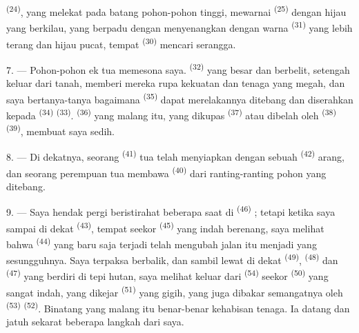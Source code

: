  \textsuperscript{(24)}, yang melekat pada batang
pohon-pohon tinggi, mewarnai  \textsuperscript{(25)}
dengan hijau yang berkilau, yang berpadu dengan menyenangkan dengan
warna  \textsuperscript{(31)} yang lebih terang dan hijau
pucat, tempat  \textsuperscript{(30)} mencari
serangga.

\VUsaut{3.0mm}
\VUsaut{3.0mm}

7. --- Pohon-pohon ek tua memesona saya. 
\textsuperscript{(32)} yang besar dan berbelit, setengah keluar dari
tanah, memberi mereka rupa kekuatan dan tenaga yang megah, dan saya
bertanya-tanya bagaimana  \textsuperscript{(35)}
dapat merelakannya ditebang dan diserahkan kepada 
\textsuperscript{(34)}  \textsuperscript{(33)}.
 \textsuperscript{(36)} yang malang itu, yang
dikupas  \textsuperscript{(37)} atau dibelah oleh
 \textsuperscript{(38)} 
\textsuperscript{(39)}, membuat saya sedih.

8. --- Di dekatnya, seorang 
\textsuperscript{(41)} tua telah menyiapkan dengan 
sebuah  \textsuperscript{(42)} arang, dan seorang
perempuan tua membawa  \textsuperscript{(40)}
 dari ranting-ranting pohon yang ditebang.

\VUsaut{3.0mm}
\VUsaut{3.0mm}

9. --- Saya hendak pergi beristirahat beberapa saat di  \textsuperscript{(46)} ; tetapi ketika saya sampai di
dekat  \textsuperscript{(43)}, tempat seekor
 \textsuperscript{(45)} yang indah berenang, saya
melihat bahwa  \textsuperscript{(44)} yang baru saja
terjadi telah mengubah jalan itu menjadi  yang
sesungguhnya. Saya terpaksa berbalik, dan sambil lewat di dekat
 \textsuperscript{(49)},  \textsuperscript{(48)} dan 
\textsuperscript{(47)} yang berdiri di tepi hutan, saya melihat keluar
dari  \textsuperscript{(54)} seekor  \textsuperscript{(50)} yang sangat indah, yang dikejar
 \textsuperscript{(51)} yang gigih, yang
juga dibakar semangatnya oleh 
\textsuperscript{(53)} 
\textsuperscript{(52)}. Binatang yang malang itu benar-benar
kehabisan tenaga. Ia datang dan jatuh sekarat beberapa langkah dari
saya.

